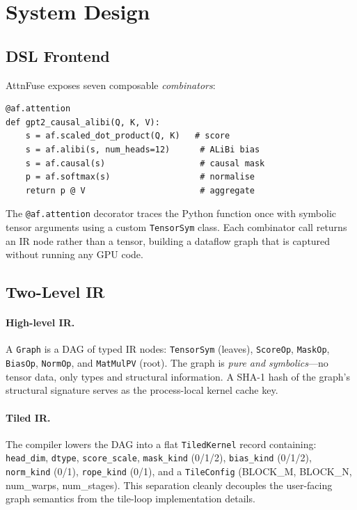 \documentclass[10pt,twocolumn]{article}
\begin{document}
\section{System Design}

\subsection{DSL Frontend}

AttnFuse exposes seven composable \emph{combinators}:

\begin{lstlisting}[caption={AttnFuse user code: GPT-2 style causal + ALiBi in 6 lines.}]
@af.attention
def gpt2_causal_alibi(Q, K, V):
    s = af.scaled_dot_product(Q, K)   # score
    s = af.alibi(s, num_heads=12)      # ALiBi bias
    s = af.causal(s)                   # causal mask
    p = af.softmax(s)                  # normalise
    return p @ V                       # aggregate
\end{lstlisting}

The \texttt{@af.attention} decorator traces the Python function once with
symbolic tensor arguments using a custom \texttt{TensorSym} class.
Each combinator call returns an IR node rather than a tensor, building a
dataflow graph that is captured without running any GPU code.

\subsection{Two-Level IR}

\paragraph{High-level IR.}
A \texttt{Graph} is a DAG of typed IR nodes:
\texttt{TensorSym} (leaves), \texttt{ScoreOp}, \texttt{MaskOp},
\texttt{BiasOp}, \texttt{NormOp}, and \texttt{MatMulPV} (root).
The graph is \emph{pure and symbolics}---no tensor data, only types and
structural information.  A SHA-1 hash of the graph's structural signature
serves as the process-local kernel cache key.

\paragraph{Tiled IR.}
The compiler lowers the DAG into a flat \texttt{TiledKernel} record
containing: \texttt{head\_dim}, \texttt{dtype}, \texttt{score\_scale},
\texttt{mask\_kind} (0/1/2), \texttt{bias\_kind} (0/1/2),
\texttt{norm\_kind} (0/1), \texttt{rope\_kind} (0/1),
and a \texttt{TileConfig} (BLOCK\_M, BLOCK\_N, num\_warps, num\_stages).
This separation cleanly decouples the user-facing graph semantics from
the tile-loop implementation details.
\end{document}

